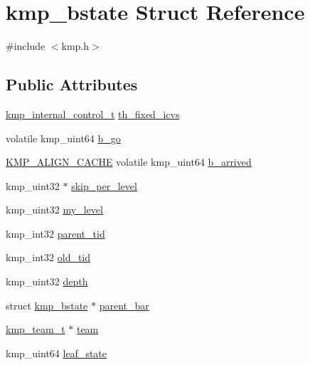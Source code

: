 \hypertarget{structkmp__bstate}{\section{kmp\-\_\-bstate Struct Reference}
\label{structkmp__bstate}
}


{\ttfamily \#include $<$kmp.\-h$>$}

\subsection*{Public Attributes}
\begin{DoxyCompactItemize}
\item 
\hyperlink{kmp_8h_aeee976c9503b72fe3e38d18d88b305cf}{kmp\-\_\-internal\-\_\-control\-\_\-t} \hyperlink{structkmp__bstate_aa4c7f2abe8346603fe96d8c17555872b}{th\-\_\-fixed\-\_\-icvs}
\item 
volatile kmp\-\_\-uint64 \hyperlink{structkmp__bstate_a5683452af6bb4ec4bf0862985bc6765f}{b\-\_\-go}
\item 
\hyperlink{kmp__os_8h_a6830c178a3906c25cd0138d8365db070}{K\-M\-P\-\_\-\-A\-L\-I\-G\-N\-\_\-\-C\-A\-C\-H\-E} volatile kmp\-\_\-uint64 \hyperlink{structkmp__bstate_a7467d3c14340048c5ecb4e5ae6b5ba0e}{b\-\_\-arrived}
\item 
kmp\-\_\-uint32 $\ast$ \hyperlink{structkmp__bstate_a0f3bfc82949c603682000e6582cadcf4}{skip\-\_\-per\-\_\-level}
\item 
kmp\-\_\-uint32 \hyperlink{structkmp__bstate_a5e230863e70f4a123e9f199cbab279dc}{my\-\_\-level}
\item 
kmp\-\_\-int32 \hyperlink{structkmp__bstate_afb96816855880f714bba4f2162408ff8}{parent\-\_\-tid}
\item 
kmp\-\_\-int32 \hyperlink{structkmp__bstate_a197984e81d9c2a932289380e558c6ee7}{old\-\_\-tid}
\item 
kmp\-\_\-uint32 \hyperlink{structkmp__bstate_aeee2bd7ab328429c59216e3e003a9750}{depth}
\item 
struct \hyperlink{structkmp__bstate}{kmp\-\_\-bstate} $\ast$ \hyperlink{structkmp__bstate_a908f228353bb5b8f94d3eb20ad82473c}{parent\-\_\-bar}
\item 
\hyperlink{kmp_8h_a95f7a64bda9b774add6c27c4a7b2a143}{kmp\-\_\-team\-\_\-t} $\ast$ \hyperlink{structkmp__bstate_a8980b8fa3491df30edcc2d53a17a77e2}{team}
\item 
kmp\-\_\-uint64 \hyperlink{structkmp__bstate_a937413b859e80adbc07973d4e2a428db}{leaf\-\_\-state}
\item 

\end{DoxyCompactItemize}
